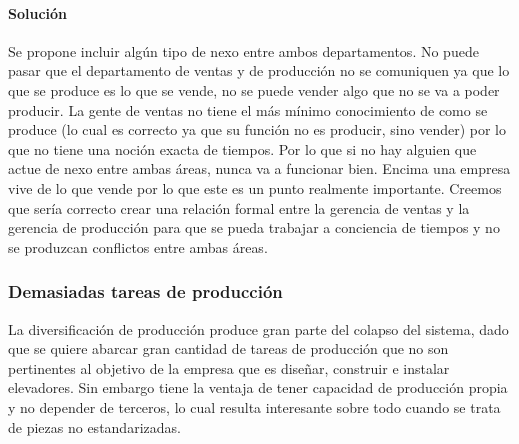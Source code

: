 \paragraph{Soluci\'on}
Se propone incluir alg\'un tipo de nexo entre ambos departamentos. No puede pasar que el departamento de ventas y de producci\'on no se comuniquen ya que lo que se produce es lo que se vende, no se puede vender algo que no se va a poder producir. La gente de ventas no tiene el m\'as m\'inimo conocimiento de como se produce (lo cual es correcto ya que su funci\'on no es producir, sino vender) por lo que no tiene una noci\'on exacta de tiempos. Por lo que si no hay alguien que actue de nexo entre ambas \'areas, nunca va a funcionar bien. Encima una empresa vive de lo que vende por lo que este es un punto realmente importante. Creemos que ser\'ia correcto crear una relaci\'on formal entre la gerencia de ventas y la gerencia de producci\'on para que se pueda trabajar a conciencia de tiempos y no se produzcan conflictos entre ambas \'areas.

\subsubsection{Demasiadas tareas de producci\'on}
La diversificaci\'on de producci\'on produce gran parte del colapso del sistema, dado que se quiere abarcar gran cantidad de tareas de producci\'{o}n que no son pertinentes al objetivo de la empresa que es dise\~nar, construir e instalar elevadores. Sin embargo tiene la ventaja de tener capacidad de producci\'on propia y no depender de terceros, lo cual resulta interesante sobre todo cuando se trata de piezas no estandarizadas.
